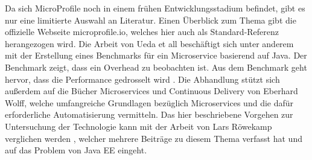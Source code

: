 Da sich MicroProfile noch in einem frühen Entwicklungsstadium befindet, gibt es nur eine limitierte Auswahl an Literatur. Einen Überblick zum Thema gibt die offizielle Webseite microprofile.io, welches hier auch als Standard-Referenz herangezogen wird. Die Arbeit von Ueda et all beschäftigt sich unter anderem mit der Erstellung eines Benchmarks für ein Microservice basierend auf Java. Der Benchmark zeigt, dass ein Overhead zu beobachten ist. Aus dem Benchmark geht hervor, dass die Performance gedrosselt wird \cite{uht.2016}. Die Abhandlung stützt sich außerdem auf die Bücher Microservices \cite{EberhardWolff.2015} und Continuous Delivery \cite{EberhardWolff.2016} von Eberhard Wolff, welche umfangreiche Grundlagen bezüglich Microservices und die dafür erforderliche Automatisierung vermitteln. Das hier beschriebene Vorgehen zur Untersuchung der Technologie kann mit der Arbeit von Lars Röwekamp verglichen werden \cite{LarsRowekamp.2016}, welcher mehrere Beiträge zu diesem Thema verfasst hat und auf das Problem von Java EE eingeht. 





